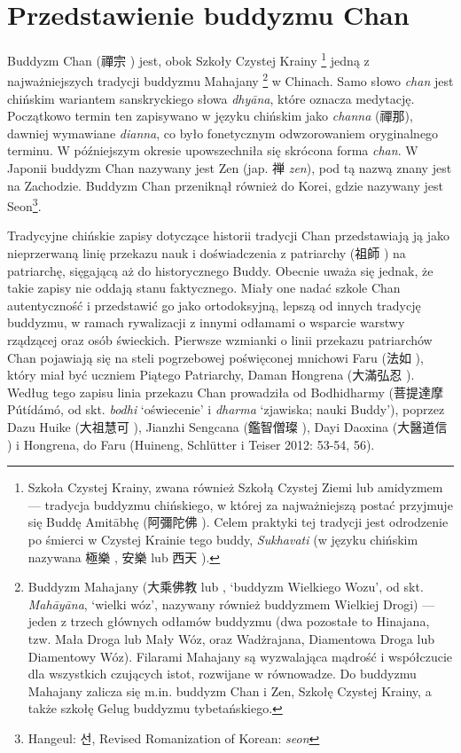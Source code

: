 \section{Przedstawienie buddyzmu Chan}
Buddyzm Chan (禪宗 ) jest, obok Szkoły Czystej Krainy%
\footnote{Szkoła Czystej Krainy, zwana również Szkołą Czystej Ziemi lub amidyzmem --- tradycja buddyzmu chińskiego, w której za najważniejszą postać przyjmuje się Buddę Amitābhę (阿彌陀佛 ). Celem praktyki tej tradycji jest odrodzenie po śmierci w Czystej Krainie tego buddy, \textit{Sukhavati} (w języku chińskim nazywana 極樂 , 安樂  lub 西天 ).}
jedną z najważniejszych tradycji buddyzmu Mahajany%
\footnote{Buddyzm Mahajany (大乘佛教  lub , `buddyzm Wielkiego Wozu', od skt. \textit{Mahāyāna}, `wielki wóz', nazywany również buddyzmem Wielkiej Drogi) --- jeden z trzech głównych odłamów buddyzmu (dwa pozostałe to Hinajana, tzw. Mała Droga lub Mały Wóz, oraz Wadżrajana, Diamentowa Droga lub Diamentowy Wóz). Filarami Mahajany są wyzwalająca mądrość i współczucie dla wszystkich czujących istot, rozwijane w równowadze. Do buddyzmu Mahajany zalicza się m.in. buddyzm Chan i Zen, Szkołę Czystej Krainy, a także szkołę Gelug buddyzmu tybetańskiego.}
w Chinach. Samo słowo \textit{chan} jest chińskim wariantem %
sanskryckiego słowa \textit{dhyāna}, które oznacza medytację.
Początkowo termin ten zapisywano w języku chińskim jako \textit{channa} (禪那), dawniej wymawiane \textit{dianna}, co było fonetycznym odwzorowaniem oryginalnego terminu.
W późniejszym okresie upowszechniła się skrócona forma \textit{chan}.
W Japonii buddyzm Chan nazywany jest Zen (jap. {\ipaexgothic 禅} \textit{zen}), pod tą nazwą znany jest na Zachodzie.
Buddyzm Chan przeniknął również do Korei, gdzie nazywany jest Seon\footnote{Hangeul: {\Korean 선}, Revised Romanization of Korean: \textit{seon}}.

Tradycyjne chińskie zapisy dotyczące historii tradycji Chan przedstawiają ją jako nieprzerwaną linię przekazu nauk i doświadczenia z patriarchy (祖師 ) na patriarchę, sięgającą aż do historycznego Buddy.
Obecnie uważa się jednak, że takie zapisy nie oddają stanu faktycznego.
Miały one nadać szkole Chan autentyczność i przedstawić go jako ortodoksyjną, lepszą od innych tradycję buddyzmu, w ramach rywalizacji z innymi odłamami o wsparcie warstwy rządzącej oraz osób świeckich.
Pierwsze wzmianki o linii przekazu patriarchów Chan pojawiają się na steli pogrzebowej poświęconej mnichowi Faru (法如 ), który miał być uczniem Piątego Patriarchy, Daman Hongrena (大滿弘忍 ).
Według tego zapisu linia przekazu Chan prowadziła od Bodhidharmy (菩提達摩 Pútídámó, od skt. \textit{bodhi} `oświecenie' i \textit{dharma} `zjawiska; nauki Buddy'), poprzez Dazu Huike  (大祖慧可 ), Jianzhi Sengcana (鑑智僧璨 ), Dayi Daoxina (大醫道信 ) i Hongrena, do Faru
(Huineng, Schlütter i Teiser 2012: 53-54, 56).

